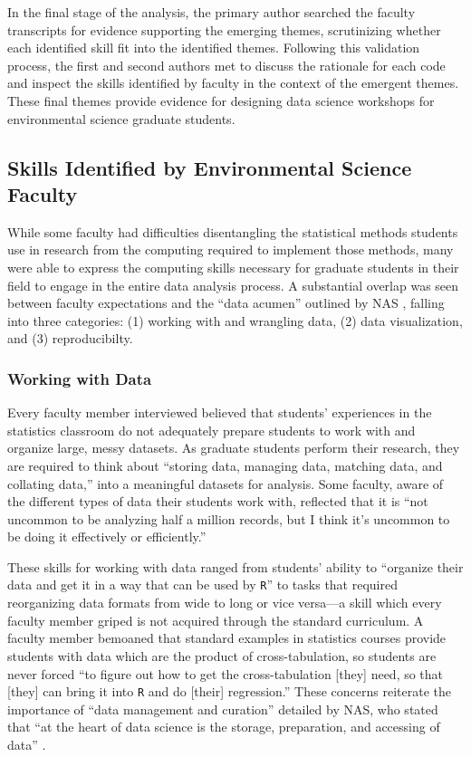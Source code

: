 \documentclass[12pt]{article}
\begin{document}
\quad In the final stage of the analysis, the primary author searched the 
faculty transcripts for evidence supporting the emerging themes, scrutinizing 
whether each identified skill fit into the identified themes. Following this 
validation process, the first and second authors met to discuss the rationale
for each code and inspect the skills identified by faculty in the context of the
emergent themes. These final themes provide evidence for designing data 
science workshops for environmental science graduate students. 

\subsection{Skills Identified by Environmental Science Faculty}

\quad While some faculty had difficulties disentangling the statistical methods
students use in research from the computing required to implement those methods,
many were able to express the computing skills necessary for graduate students
in their field to engage in the entire data analysis process. A substantial
overlap was seen between faculty expectations and the ``data acumen'' outlined
by NAS \citep{nas}, falling into three categories: (1) working with and
wrangling data, (2) data visualization, and (3) reproducibilty.

\subsubsection{Working with Data}  

\quad Every faculty member interviewed believed that students' experiences in the
statistics classroom do not adequately prepare students to work with and
organize large, messy datasets. As graduate students perform their research,
they are required to think about ``storing data, managing data, matching
data, and collating data,'' into a meaningful datasets for analysis. Some 
faculty, aware of the different types of data their students work with, 
reflected that it is ``not uncommon to be analyzing half a million records, but
I think it's uncommon to be doing it effectively or efficiently.'' 

\quad These skills for working with data ranged from students' ability to 
``organize their data and get it in a way that can be used by \texttt{R}'' to 
tasks that required reorganizing data formats from wide to long or vice 
versa---a skill which every faculty member griped is not acquired through the
standard curriculum. A faculty member bemoaned that standard examples in
statistics courses provide students with data which are the product
of cross-tabulation, so students are never forced ``to figure out how to get the
cross-tabulation [they] need, so that [they] can bring it into \texttt{R} and do
[their] regression.'' These concerns reiterate the importance of ``data
management and curation'' detailed by NAS, who stated that ``at the heart of
data science is the storage, preparation, and accessing of data'' 
\citep[p.\ 26]{nas}. 
\end{document}
